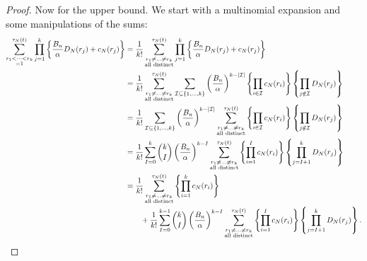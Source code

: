 \documentclass{article}
\newcommand{\1}[1]{\mathbb{I}_{#1}}
\begin{document}
\begin{proof}
Now for the upper bound. We start with a multinomial expansion and some manipulations of the sums:
\begin{align}
\sum_{\substack{r_1<\dots<r_k \\ =1}}^{\tau_N(t)}\prod_{j=1}^k 
\left\{ \frac{B_n}{\alpha} D_N(r_j) + c_N(r_j) \right\}
&= \frac{1}{k!} \sum_{\substack{r_1\neq\dots\neq r_k \\\text{all distinct}}}^{\tau_N(t)}
\prod_{j=1}^k 
\left\{ \frac{B_n}{\alpha} D_N(r_j) + c_N(r_j) \right\} \notag\\
&= \frac{1}{k!} \sum_{\substack{r_1\neq\dots\neq r_k \\\text{all distinct}}}^{\tau_N(t)} 
\sum_{\mathcal{I}\subseteq \{1,\dots ,k\}}  
\left( \frac{B_n}{\alpha} \right)^{k-|\mathcal{I}|}
\left\{ \prod_{i\in\mathcal{I}} c_N(r_i) \right\} \left\{ \prod_{j\notin \mathcal{I}} D_N(r_j) \right\} \notag\\
&= \frac{1}{k!} 
\sum_{\mathcal{I}\subseteq \{1,\dots ,k\}}  
\left( \frac{B_n}{\alpha} \right)^{k-|\mathcal{I}|}
\sum_{\substack{r_1\neq\dots\neq r_k \\\text{all distinct}}}^{\tau_N(t)}
\left\{ \prod_{i\in\mathcal{I}} c_N(r_i) \right\} \left\{ \prod_{j\notin \mathcal{I}} D_N(r_j) \right\} \notag\\
&= \frac{1}{k!}
\sum_{I=0}^k  \binom{k}{I}
\left( \frac{B_n}{\alpha} \right)^{k-I}
\sum_{\substack{r_1\neq\dots\neq r_k \\\text{all distinct}}}^{\tau_N(t)} 
\left\{ \prod_{i=1}^{I} c_N(r_i) \right\} \left\{ \prod_{j=I+1}^k D_N(r_j) \right\} \notag\\
&= \frac{1}{k!} \sum_{\substack{r_1\neq\dots\neq r_k \\\text{all distinct}}}^{\tau_N(t)} 
\left\{ \prod_{i=1}^{k} c_N(r_i) \right\} \notag\\
&\qquad + \frac{1}{k!}
\sum_{I=0}^{k-1}  \binom{k}{I}
\left( \frac{B_n}{\alpha} \right)^{k-I}
\sum_{\substack{r_1\neq\dots\neq r_k \\\text{all distinct}}}^{\tau_N(t)} 
\left\{ \prod_{i=1}^{I} c_N(r_i) \right\} \left\{ \prod_{j=I+1}^k D_N(r_j) \right\} .

\end{align}
\end{proof}
\end{document}
